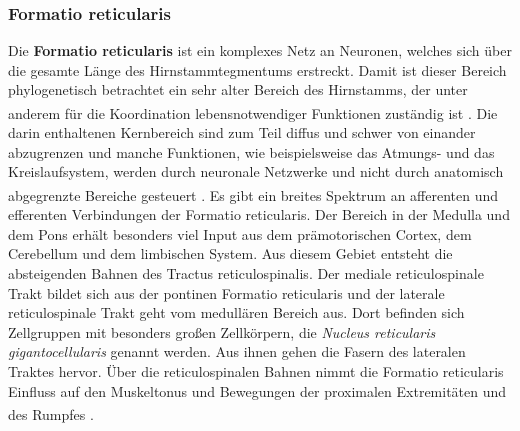 \subsubsection*{Formatio reticularis} 
Die \textbf{Formatio reticularis} ist ein komplexes Netz an Neuronen, welches sich über die gesamte Länge des Hirnstammtegmentums erstreckt. Damit ist dieser Bereich phylogenetisch betrachtet ein sehr alter Bereich des Hirnstamms, der unter anderem für die Koordination lebensnotwendiger Funktionen zuständig ist \textsuperscript{\cite[6]{trepel2011neuroanatomie}}. Die darin enthaltenen Kernbereich sind zum Teil diffus und schwer von einander abzugrenzen und manche Funktionen, wie beispielsweise das Atmungs- und das Kreislaufsystem, werden durch neuronale Netzwerke und nicht durch anatomisch abgegrenzte Bereiche gesteuert \textsuperscript{\cite[9]{crossman2014neuroanatomy}}. 
Es gibt ein breites Spektrum an afferenten und efferenten Verbindungen der Formatio reticularis. Der Bereich in der Medulla und dem Pons erhält besonders viel Input aus dem prämotorischen Cortex, dem Cerebellum und dem limbischen System. Aus diesem Gebiet entsteht die absteigenden Bahnen des Tractus reticulospinalis. Der mediale reticulospinale Trakt bildet sich aus der pontinen Formatio reticularis und der laterale reticulospinale Trakt geht vom medullären Bereich aus. Dort befinden sich Zellgruppen mit besonders großen Zellkörpern, die \textit{Nucleus reticularis gigantocellularis} genannt werden. Aus ihnen gehen die Fasern des lateralen Traktes hervor. Über die reticulospinalen Bahnen nimmt die Formatio reticularis Einfluss auf den Muskeltonus und Bewegungen der proximalen Extremitäten und des Rumpfes \textsuperscript{\cite[9]{crossman2014neuroanatomy}}.
\newpage
